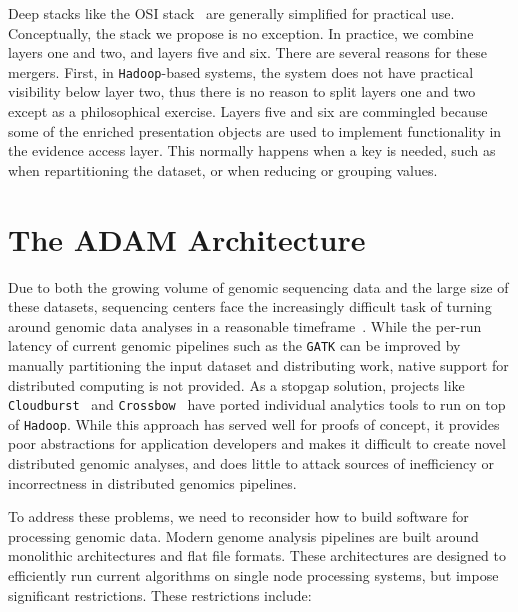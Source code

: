 \documentclass[phd]{ucbthesis}
\begin{document}
Deep stacks like the OSI stack~\cite{zimmermann80} are generally simplified for practical use. Conceptually,
the stack we propose is no exception. In practice, we combine layers one and two, and layers five and six.
There are several reasons for these mergers. First, in \texttt{Hadoop}-based systems, the system does not have practical visibility
below layer two, thus there is no reason to split layers one and two except as a philosophical exercise.
Layers five and six are commingled because some of the enriched presentation objects are used to
implement functionality in the evidence access layer. This normally happens when a key is needed, such as
when repartitioning the dataset, or when reducing or grouping values.

\chapter{The \textsc{ADAM} Architecture}
\label{chap:architecture}

Due to both the growing volume of genomic sequencing data and the large size of these datasets,
sequencing centers face the increasingly difficult task of turning around genomic data analyses in a
reasonable timeframe~\cite{schadt10, stein10}. While the per-run latency of current genomic pipelines
such as the \texttt{GATK} can be improved by manually partitioning the input dataset and distributing
work, native support for distributed computing is not provided. As a stopgap solution, projects like
\texttt{Cloudburst}~\cite{schatz09} and \texttt{Crossbow}~\cite{langmead09} have ported individual
analytics tools to run on top of \texttt{Hadoop}. While this approach has served well for proofs of concept,
it provides poor abstractions for application developers and makes it difficult to create novel distributed
genomic analyses, and does little to attack sources of inefficiency or incorrectness in distributed
genomics pipelines.

To address these problems, we need to reconsider how to build software for processing genomic data.
Modern genome analysis pipelines are built around monolithic architectures and flat file formats.
These architectures are designed to efficiently run current algorithms on single node processing
systems, but impose significant restrictions. These restrictions include:
\end{document}
